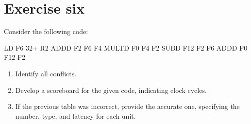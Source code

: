 \section{Exercise six}

Consider the following code:
\begin{verbnobox}[\verbarg]
LD F6 32+ R2
ADDD F2 F6 F4
MULTD F0 F4 F2
SUBD F12 F2 F6
ADDD F0 F12 F2
\end{verbnobox}
\begin{enumerate}
    \item Identify all conflicts.
    \item Develop a scoreboard for the given code, indicating clock cycles.
    \item If the previous table was incorrect, provide the accurate one, specifying the number, type, and latency for each unit.
\end{enumerate}

